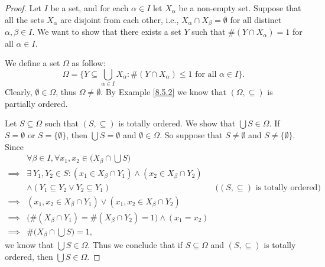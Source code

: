\begin{proof}
    Let \(I\) be a set, and for each \(\alpha \in I\) let \(X_{\alpha}\) be a non-empty set.
    Suppose that all the sets \(X_{\alpha}\) are disjoint from each other, i.e., \(X_{\alpha} \cap X_{\beta} = \emptyset\) for all distinct \(\alpha, \beta \in I\).
    We want to show that there exists a set \(Y\) such that \(\#(Y \cap X_{\alpha}) = 1\) for all \(\alpha \in I\).

    We define a set \(\Omega\) as follow:
    \[
        \Omega = \{Y \subseteq \bigcup_{\alpha \in I} X_{\alpha} : \#(Y \cap X_{\alpha}) \leq 1 \text{ for all } \alpha \in I\}.
    \]
    Clearly, \(\emptyset \in \Omega\), thus \(\Omega \neq \emptyset\).
    By Example \ref{8.5.2} we know that \((\Omega, \subseteq)\) is partially ordered.

    Let \(S \subseteq \Omega\) such that \((S, \subseteq)\) is totally ordered.
    We show that \(\bigcup S \in \Omega\).
    If \(S = \emptyset\) or \(S = \{\emptyset\}\), then \(\bigcup S = \emptyset\) and \(\emptyset \in \Omega\).
    So suppose that \(S \neq \emptyset\) and \(S \neq \{\emptyset\}\).
    Since
    \begin{align*}
                 & \forall \beta \in I, \forall x_1, x_2 \in \Big(X_{\beta} \cap \bigcup S\Big)                                                               \\
        \implies & \exists\ Y_1, Y_2 \in S : (x_1 \in X_{\beta} \cap Y_1) \land (x_2 \in X_{\beta} \cap Y_2)                                                  \\
                 & \land (Y_1 \subseteq Y_2 \lor Y_2 \subseteq Y_1)                                          & \text{(\((S, \subseteq)\) is totally ordered)} \\
        \implies & (x_1, x_2 \in X_{\beta} \cap Y_1) \lor (x_1, x_2 \in X_{\beta} \cap Y_2)                                                                   \\
        \implies & \big(\#(X_{\beta} \cap Y_1) = \#(X_{\beta} \cap Y_2) = 1\big) \land (x_1 = x_2)                                                            \\
        \implies & \#\Big(X_{\beta} \cap \bigcup S\Big) = 1,
    \end{align*}
    we know that \(\bigcup S \in \Omega\).
    Thus we conclude that if \(S \subseteq \Omega\) and \((S, \subseteq)\) is totally ordered, then \(\bigcup S \in \Omega\).


\end{proof}
